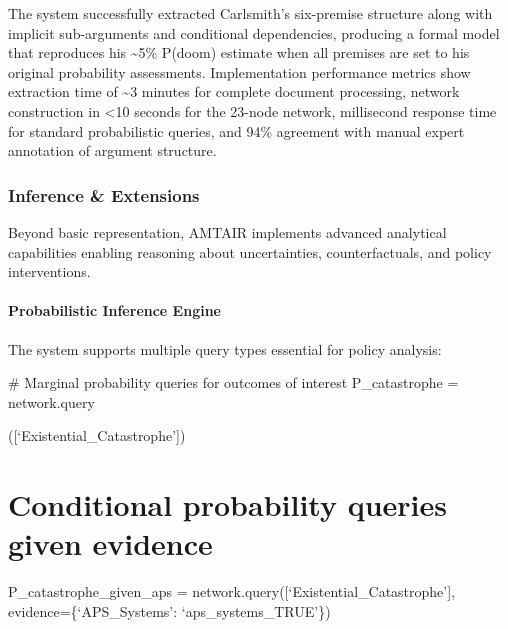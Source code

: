 \documentclass[
  11pt,
  letterpaper,
]{book}
\newenvironment{Shaded}{\begin{snugshade}}{\end{snugshade}}
\newcommand{\CommentTok}[1]{\textcolor[rgb]{0.37,0.37,0.37}{#1}}
\newcommand{\NormalTok}[1]{\textcolor[rgb]{0.00,0.23,0.31}{#1}}
\newcommand{\OperatorTok}[1]{\textcolor[rgb]{0.37,0.37,0.37}{#1}}
\begin{document}
The system successfully extracted Carlsmith's six-premise structure
along with implicit sub-arguments and conditional dependencies,
producing a formal model that reproduces his \textasciitilde5\% P(doom)
estimate when all premises are set to his original probability
assessments. Implementation performance metrics show extraction time of
\textasciitilde3 minutes for complete document processing, network
construction in \textless10 seconds for the 23-node network, millisecond
response time for standard probabilistic queries, and 94\% agreement
with manual expert annotation of argument structure.

\subsection{Inference \& Extensions}\label{sec-inference-extensions}

Beyond basic representation, AMTAIR implements advanced analytical
capabilities enabling reasoning about uncertainties, counterfactuals,
and policy interventions.

\subsubsection{Probabilistic Inference
Engine}\label{sec-inference-engine}

The system supports multiple query types essential for policy analysis:

\begin{Shaded}
\begin{Highlighting}[]
\CommentTok{\# Marginal probability queries for outcomes of interest}
\NormalTok{P\_catastrophe }\OperatorTok{=}\NormalTok{ network.query}
\end{Highlighting}
\end{Shaded}

({[}`Existential\_Catastrophe'{]})


\chapter{Conditional probability queries given
evidence}\label{conditional-probability-queries-given-evidence}

P\_catastrophe\_given\_aps =
network.query({[}`Existential\_Catastrophe'{]},
evidence=\{`APS\_Systems': `aps\_systems\_TRUE'\})

\end{document}
